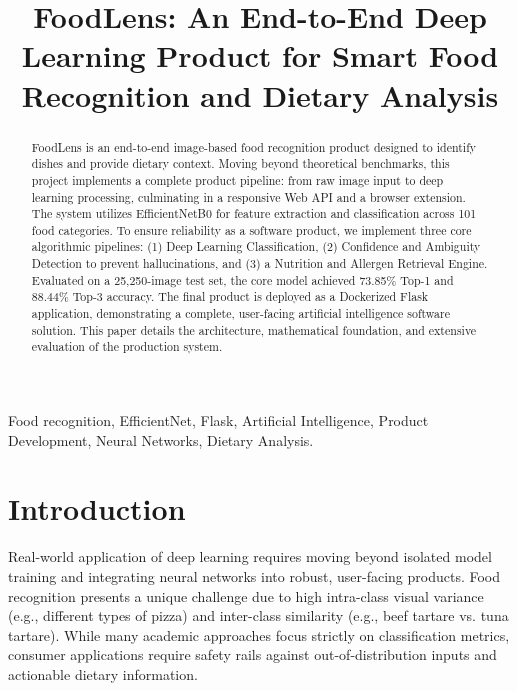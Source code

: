\documentclass[conference]{IEEEtran}
\begin{document}
\title{FoodLens: An End-to-End Deep Learning Product for Smart Food Recognition and Dietary Analysis}

\author{
}

\maketitle

\begin{abstract}
FoodLens is an end-to-end image-based food recognition product designed to identify dishes and provide dietary context. Moving beyond theoretical benchmarks, this project implements a complete product pipeline: from raw image input to deep learning processing, culminating in a responsive Web API and a browser extension. The system utilizes EfficientNetB0 for feature extraction and classification across 101 food categories. To ensure reliability as a software product, we implement three core algorithmic pipelines: (1) Deep Learning Classification, (2) Confidence and Ambiguity Detection to prevent hallucinations, and (3) a Nutrition and Allergen Retrieval Engine. Evaluated on a 25,250-image test set, the core model achieved 73.85\% Top-1 and 88.44\% Top-3 accuracy. The final product is deployed as a Dockerized Flask application, demonstrating a complete, user-facing artificial intelligence software solution. This paper details the architecture, mathematical foundation, and extensive evaluation of the production system.
\end{abstract}

\begin{IEEEkeywords}
Food recognition, EfficientNet, Flask, Artificial Intelligence, Product Development, Neural Networks, Dietary Analysis.
\end{IEEEkeywords}

\section{Introduction}
Real-world application of deep learning requires moving beyond isolated model training and integrating neural networks into robust, user-facing products. Food recognition presents a unique challenge due to high intra-class visual variance (e.g., different types of pizza) and inter-class similarity (e.g., beef tartare vs. tuna tartare). While many academic approaches focus strictly on classification metrics, consumer applications require safety rails against out-of-distribution inputs and actionable dietary information.
\end{document}
